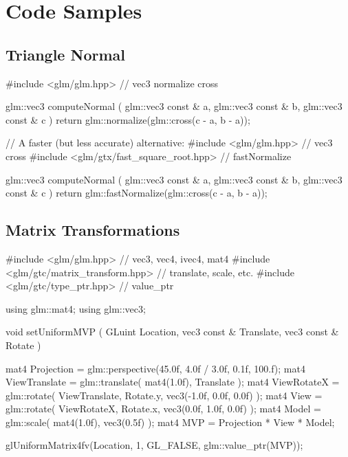 \documentclass{scrartcl}
\numberwithin{figure}{subsection}
\begin{document}
\newpage{}

\section{Code Samples}

\subsection{Triangle Normal}

\begin{cppcode}
#include <glm/glm.hpp> // vec3 normalize cross

glm::vec3 computeNormal
(
  glm::vec3 const & a, 
  glm::vec3 const & b,
  glm::vec3 const & c
)
{
  return glm::normalize(glm::cross(c - a, b - a));
}
\end{cppcode}

\begin{cppcode}
// A faster (but less accurate) alternative:
#include <glm/glm.hpp> // vec3 cross
#include <glm/gtx/fast_square_root.hpp> // fastNormalize

glm::vec3 computeNormal
(
  glm::vec3 const & a, 
  glm::vec3 const & b,
  glm::vec3 const & c
)
{
  return glm::fastNormalize(glm::cross(c - a, b - a));
}
\end{cppcode}



\subsection{Matrix Transformations}

\begin{cppcode}
#include <glm/glm.hpp> // vec3, vec4, ivec4, mat4
#include <glm/gtc/matrix_transform.hpp> // translate, scale, etc.
#include <glm/gtc/type_ptr.hpp> // value_ptr

using glm::mat4;
using glm::vec3;

void setUniformMVP
(
  GLuint Location, 
  vec3 const & Translate, 
  vec3 const & Rotate
)
{
  mat4 Projection = glm::perspective(45.0f, 4.0f / 3.0f, 0.1f, 100.f);
  mat4 ViewTranslate = glm::translate(
    mat4(1.0f),
    Translate
  );
  mat4 ViewRotateX = glm::rotate(
    ViewTranslate,
    Rotate.y,
    vec3(-1.0f, 0.0f, 0.0f)
  );
  mat4 View = glm::rotate(
    ViewRotateX,
    Rotate.x,
    vec3(0.0f, 1.0f, 0.0f)
  );
  mat4 Model = glm::scale(
    mat4(1.0f),
    vec3(0.5f)
  );
  mat4 MVP = Projection * View * Model;

  glUniformMatrix4fv(Location, 1, GL_FALSE, glm::value_ptr(MVP));
}
\end{cppcode}
\end{document}
